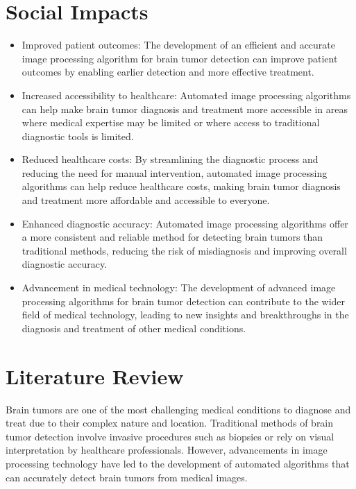 \documentclass{article}
\begin{document}
\section{Social Impacts}
\begin{itemize}
    \item Improved patient outcomes: The development of an efficient and accurate image processing algorithm for brain tumor detection can improve patient outcomes by enabling earlier detection and more effective treatment.

\item Increased accessibility to healthcare: Automated image processing algorithms can help make brain tumor diagnosis and treatment more accessible in areas where medical expertise may be limited or where access to traditional diagnostic tools is limited.

\item Reduced healthcare costs: By streamlining the diagnostic process and reducing the need for manual intervention, automated image processing algorithms can help reduce healthcare costs, making brain tumor diagnosis and treatment more affordable and accessible to everyone.

\item Enhanced diagnostic accuracy: Automated image processing algorithms offer a more consistent and reliable method for detecting brain tumors than traditional methods, reducing the risk of misdiagnosis and improving overall diagnostic accuracy.

\item Advancement in medical technology: The development of advanced image processing algorithms for brain tumor detection can contribute to the wider field of medical technology, leading to new insights and breakthroughs in the diagnosis and treatment of other medical conditions.
\end{itemize}
\section{Literature Review}
Brain tumors are one of the most challenging medical conditions to diagnose and treat due to their complex nature and location. Traditional methods of brain tumor detection involve invasive procedures such as biopsies or rely on visual interpretation by healthcare professionals. However, advancements in image processing technology have led to the development of automated algorithms that can accurately detect brain tumors from medical images.
\end{document}
